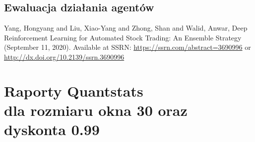 \documentclass[12pt,a4paper]{article}
\begin{document}
\subsection{Ewaluacja działania agentów}


\pagebreak
\begin{thebibliography}{9}
  Yang, Hongyang and Liu, Xiao-Yang and Zhong, Shan and Walid, Anwar,
  Deep Reinforcement Learning for Automated Stock Trading: An Ensemble
  Strategy (September 11, 2020). Available at SSRN:
  \href{https://ssrn.com/abstract=3690996}{https://ssrn.com/abstract=3690996}
  or \href{http://dx.doi.org/10.2139/ssrn.3690996}{http://dx.doi.org/10.2139/ssrn.3690996}
\end{thebibliography}

\pagebreak
\appendix
\section{Raporty Quantstats \\
  dla rozmiaru okna 30 oraz dyskonta 0.99}
\end{document}

